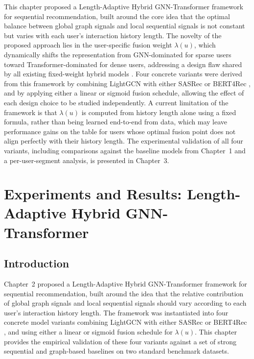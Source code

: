 \documentclass[12pt,a4paper]{report}
\begin{document}
This chapter proposed a Length-Adaptive Hybrid GNN-Transformer framework for
sequential recommendation, built around the core idea that the optimal balance
between global graph signals and local sequential signals is not constant but
varies with each user's interaction history length. The novelty of the proposed
approach lies in the user-specific fusion weight \(\lambda(u)\), which
dynamically shifts the representation from GNN-dominated for sparse users
toward Transformer-dominated for dense users, addressing a design flaw shared
by all existing fixed-weight hybrid models \citep{wu2020gnnsurvey,
pan2024survey}. Four concrete variants were derived from this framework by
combining LightGCN \citep{he2020lightgcn} with either SASRec
\citep{kang2018sasrec} or BERT4Rec \citep{sun2019bert4rec}, and by applying
either a linear or sigmoid fusion schedule, allowing the effect of each design
choice to be studied independently. A current limitation of the framework is
that \(\lambda(u)\) is computed from history length alone using a fixed
formula, rather than being learned end-to-end from data, which may leave
performance gains on the table for users whose optimal fusion point does not
align perfectly with their history length. The experimental validation of all
four variants, including comparisons against the baseline models from
Chapter~1 and a per-user-segment analysis, is presented in Chapter~3.

\chapter{Experiments and Results: Length-Adaptive Hybrid GNN-Transformer}

\section{Introduction}

Chapter~2 proposed a Length-Adaptive Hybrid GNN-Transformer framework for
sequential recommendation, built around the idea that the relative contribution
of global graph signals and local sequential signals should vary according to
each user's interaction history length. The framework was instantiated into four
concrete model variants combining LightGCN \citep{he2020lightgcn} with either
SASRec \citep{kang2018sasrec} or BERT4Rec \citep{sun2019bert4rec}, and using
either a linear or sigmoid fusion schedule for \(\lambda(u)\). This chapter
provides the empirical validation of these four variants against a set of
strong sequential and graph-based baselines on two standard benchmark datasets.
\end{document}
